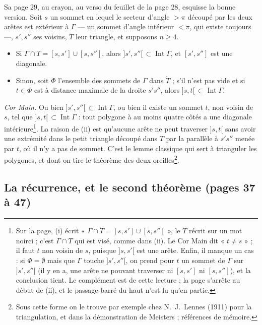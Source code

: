 \documentclass[11pt,a4paper]{article}
\begin{document}
Sa page 29, au crayon, au verso du feuillet de la page 28, esquisse la bonne
version. Soit $s$ un sommet en lequel le secteur d'angle $> \pi$ découpé par
les deux arêtes est extérieur à $\Gamma$ — un sommet d'angle intérieur $< \pi$,
qui existe toujours —, $s', s''$ ses voisins, $T$ leur triangle, et supposons
$n \geq 4$.
\begin{itemize}
  \item[(i)] Si $\Gamma \cap T = [s, s'] \cup [s, s'']$, alors $]s', s''[\,
    \subset \operatorname{Int}\Gamma$, et $[s', s'']$ est une diagonale.
  \item[(ii)] Sinon, soit $\Phi$ l'ensemble des sommets de $\Gamma$ dans
    $\mathring{T}$ ; s'il n'est pas vide et si $t \in \Phi$ est à distance
    maximale de la droite $s's''$, alors $]s, t[\, \subset
    \operatorname{Int}\Gamma$.
\end{itemize}
\emph{Cor Main.} Ou bien $]s', s''[\, \subset \operatorname{Int}\Gamma$, ou
bien il existe un sommet $t$, non voisin de $s$, tel que $]s, t[\, \subset
\operatorname{Int}\Gamma$ : tout polygone à au moins quatre côtés a une
diagonale intérieure\footnote{Sur la page, (i) écrit « $\Gamma \cap \mathring{T}
= [s, s'] \cup [s, s'']$ », le $\mathring{T}$ récrit sur un mot noirci ; c'est
$\Gamma \cap T$ qui est visé, comme dans (ii). Le Cor Main dit « $t \neq s$ » ;
il faut $t$ non voisin de $s$, puisque $]s, s'[$ est une arête. Enfin, il
manque un cas : si $\Phi = \emptyset$ mais que $\Gamma$ touche $]s', s''[$, on
prend pour $t$ un sommet de $\Gamma$ sur $]s', s''[$ (il y en a, une arête ne
pouvant traverser ni $[s, s']$ ni $[s, s'']$), et la conclusion tient. Le
complément est de cette lecture ; la page s'arrête au début de (ii), et le
passage barré du haut n'est lu qu'en partie.}.
La raison de (ii) est qu'aucune arête ne peut traverser $]s, t[$ sans avoir une
extrémité dans le petit triangle découpé dans $T$ par la parallèle à $s's''$
menée par $t$, où il n'y a pas de sommet. C'est le lemme classique qui sert à
trianguler les polygones, et dont on tire le théorème des deux
oreilles\footnote{Sous cette forme on le trouve par exemple chez N.~J.~Lennes
(1911) pour la triangulation, et dans la démonstration de Meisters ; références
de mémoire.}.

\subsection*{La récurrence, et le second théorème (pages 37 à 47)}
\end{document}
